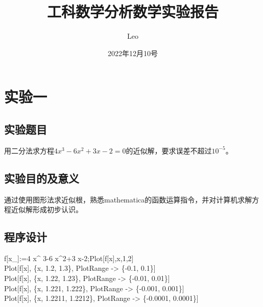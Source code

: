 \documentclass{ctexart}
\title{工科数学分析数学实验报告}
\author{Leo}
\date{2022年12月10号}
\begin{document}
\maketitle
\section{实验一}
\subsection{实验题目}
用二分法求方程$4x^3-6x^2+3x-2=0$的近似解，要求误差不超过$10^{-5}$。
\subsection{实验目的及意义}
通过使用图形法求近似根，熟悉mathematica的函数运算指令，并对计算机求解方程近似解形成初步认识。
\subsection{程序设计}
\noindent f[x\_]:=4 x\^{} 3-6 x\^{}2+3 x-2;Plot[f[x],{x,1,2}]\\
Plot[f[x], \{x, 1.2, 1.3\}, PlotRange -> \{-0.1, 0.1\}]\\
Plot[f[x], \{x, 1.22, 1.23\}, PlotRange -> \{-0.01, 0.01\}]\\
Plot[f[x], \{x, 1.221, 1.222\}, PlotRange -> \{-0.001, 0.001\}]\\
Plot[f[x], \{x, 1.2211, 1.2212\}, PlotRange -> \{-0.0001, 0.0001\}]\\
\end{document}
